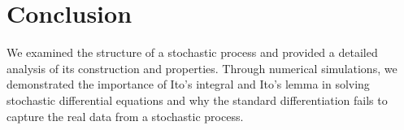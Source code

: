 \section{Conclusion}
We examined the structure of a stochastic process and provided a detailed analysis of its construction and properties. Through numerical simulations, we demonstrated the importance of Ito's integral and Ito's lemma in solving stochastic differential equations and why the standard differentiation fails to capture the real data from a stochastic process.